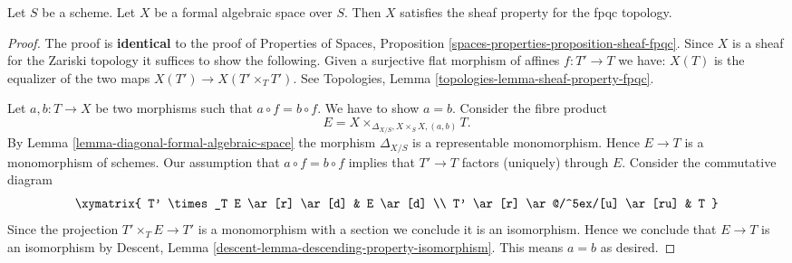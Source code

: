\begin{lemma}
\label{lemma-sheaf-fpqc}
Let $S$ be a scheme. Let $X$ be a formal algebraic space over $S$. Then
$X$ satisfies the sheaf property for the fpqc topology.
\end{lemma}

\begin{proof}
The proof is {\bf identical} to the proof of
Properties of Spaces, Proposition
\ref{spaces-properties-proposition-sheaf-fpqc}.
Since $X$ is a sheaf for the Zariski topology it
suffices to show the following. Given a surjective
flat morphism of affines $f : T' \to T$ we have:
$X(T)$ is the equalizer of the two maps $X(T') \to X(T' \times_T T')$.
See Topologies, Lemma \ref{topologies-lemma-sheaf-property-fpqc}.

\medskip\noindent
Let $a, b : T \to X$ be two morphisms such that $a \circ f = b \circ f$.
We have to show $a = b$. Consider the fibre product
$$
E = X \times_{\Delta_{X/S}, X \times_S X, (a, b)} T.
$$
By Lemma \ref{lemma-diagonal-formal-algebraic-space}
the morphism $\Delta_{X/S}$ is a representable monomorphism. Hence
$E \to T$ is a monomorphism of schemes. Our assumption that
$a \circ f = b \circ f$ implies that $T' \to T$ factors (uniquely) through $E$.
Consider the commutative diagram
$$
\xymatrix{
T' \times_T E \ar[r] \ar[d] & E \ar[d] \\
T' \ar[r] \ar@/^5ex/[u] \ar[ru] & T
}
$$
Since the projection $T' \times_T E \to T'$ is a monomorphism
with a section we conclude it is an isomorphism. Hence we conclude that
$E \to T$ is an isomorphism by
Descent, Lemma \ref{descent-lemma-descending-property-isomorphism}.
This means $a = b$ as desired.


\end{proof}
